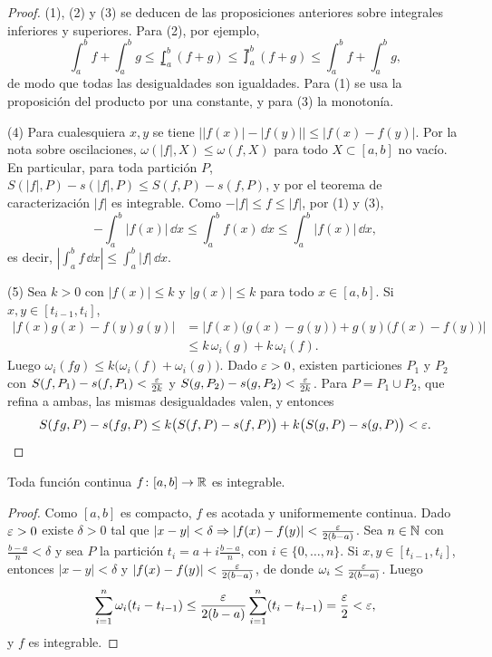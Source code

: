 \begin{proof}
  (1), (2) y (3) se deducen de las proposiciones anteriores sobre integrales inferiores y superiores. Para (2), por ejemplo,
  \[
    \int_a^b f + \int_a^b g \leq \lowint_a^b (f + g) \leq \upint_a^b (f + g) \leq \int_a^b f + \int_a^b g,
  \]
  de modo que todas las desigualdades son igualdades. Para (1) se usa la proposición del producto por una constante, y para (3) la monotonía.

  (4) Para cualesquiera \(x, y\) se tiene \(\bigl| |f(x)| - |f(y)| \bigr| \leq |f(x) - f(y)|\). Por la nota sobre oscilaciones, \(\omega(|f|, X) \leq \omega(f, X)\) para todo \(X \subset [a, b]\) no vacío. En particular, para toda partición \(P\), \(S(|f|, P) - s(|f|, P) \leq S(f, P) - s(f, P)\), y por el teorema de caracterización \(|f|\) es integrable. Como \(-|f| \leq f \leq |f|\), por (1) y (3),
  \[
    -\int_a^b |f(x)| \,\dd x \leq \int_a^b f(x) \,\dd x \leq \int_a^b |f(x)| \,\dd x,
  \]
  es decir, \(\left| \int_a^b f \,\dd x \right| \leq \int_a^b |f| \,\dd x\).

  (5) Sea \(k > 0\) con \(|f(x)| \leq k\) y \(|g(x)| \leq k\) para todo \(x \in [a, b]\). Si \(x, y \in [t_{i-1}, t_i]\),
  \begin{align*}
    |f(x) g(x) - f(y) g(y)| & = |f(x) \bigl( g(x) - g(y) \bigr) + g(y) \bigl( f(x) - f(y) \bigr)|          \\
                            & \leq k\, \omega_i(g) + k\, \omega_i(f).
  \end{align*}
  Luego \(\omega_i(fg) \leq k \bigl( \omega_i(f) + \omega_i(g) \bigr)\). Dado \(\varepsilon > 0\), existen particiones \(P_1\) y \(P_2\) con \(S(f, P_1) - s(f, P_1) < \frac{\varepsilon}{2k}\) y \(S(g, P_2) - s(g, P_2) < \frac{\varepsilon}{2k}\). Para \(P = P_1 \cup P_2\), que refina a ambas, las mismas desigualdades valen, y entonces
  \[
    S(fg, P) - s(fg, P) \leq k \bigl( S(f, P) - s(f, P) \bigr) + k \bigl( S(g, P) - s(g, P) \bigr) < \varepsilon. \qedhere
  \]
\end{proof}

\begin{theorem}
  Toda función continua \(f\colon [a, b] \to \mathbb{R}\) es integrable.
\end{theorem}

\begin{proof}
  Como \([a, b]\) es compacto, \(f\) es acotada y uniformemente continua. Dado \(\varepsilon > 0\) existe \(\delta > 0\) tal que \(|x - y| < \delta \Rightarrow |f(x) - f(y)| < \frac{\varepsilon}{2(b - a)}\). Sea \(n \in \mathbb{N}\) con \(\frac{b - a}{n} < \delta\) y sea \(P\) la partición \(t_i = a + i \frac{b - a}{n}\), con \(i \in \{0, \dots, n\}\). Si \(x, y \in [t_{i-1}, t_i]\), entonces \(|x - y| < \delta\) y \(|f(x) - f(y)| < \frac{\varepsilon}{2(b - a)}\), de donde \(\omega_i \leq \frac{\varepsilon}{2(b - a)}\). Luego
  \[
    \sum_{i=1}^{n} \omega_i (t_i - t_{i-1}) \leq \frac{\varepsilon}{2(b - a)} \sum_{i=1}^{n} (t_i - t_{i-1}) = \frac{\varepsilon}{2} < \varepsilon,
  \]
  y \(f\) es integrable.
\end{proof}

